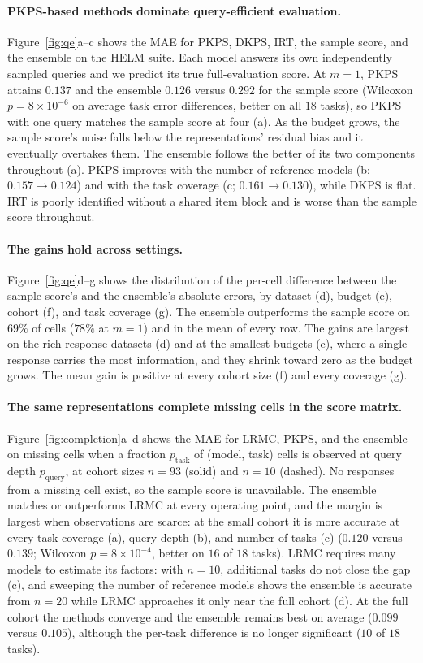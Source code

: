 \documentclass{article}
\theoremstyle{definition}
\theoremstyle{plain}
\newcommand{\PKPS}{PKPS\xspace}
\begin{document}
\paragraph{\PKPS-based methods dominate query-efficient evaluation.}
Figure~\ref{fig:qe}a--c shows the MAE for \PKPS, DKPS, IRT, the sample score, and
the ensemble on the HELM suite.
Each model answers its own independently sampled queries and we predict its true
full-evaluation score.
At $m{=}1$, \PKPS attains $0.137$ and the ensemble $0.126$ versus $0.292$ for the sample score (Wilcoxon $p{=}8\times10^{-6}$ on average task error differences, better on all $18$ tasks), so \PKPS with one query matches the sample score at four (a).
As the budget grows, the sample score's noise falls below the representations'
residual bias and it eventually overtakes them.
The ensemble follows the better of its two components
throughout (a).
\PKPS improves with the number of reference models
(b; $0.157\!\to\!0.124$) and with the task coverage (c; $0.161\!\to\!0.130$),
while DKPS is flat.
IRT is poorly identified without a shared item block and is worse than the sample
score throughout.

\paragraph{The gains hold across settings.}
Figure~\ref{fig:qe}d--g shows the distribution of the per-cell difference between
the sample score's and the ensemble's absolute errors, by dataset (d), budget (e),
cohort (f), and task coverage (g).
The ensemble outperforms the sample score on $69\%$ of cells ($78\%$ at $m{=}1$)
and in the mean of every row.
The gains are largest on the rich-response datasets (d) and at the smallest budgets
(e), where a single response carries the most information, and they shrink toward
zero as the budget grows.
The mean gain is positive at every cohort size (f) and every coverage (g).

\paragraph{The same representations complete missing cells in the score matrix.}
Figure~\ref{fig:completion}a--d shows the MAE for LRMC, \PKPS, and the ensemble on
missing cells when a fraction $p_{\mathrm{task}}$ of (model, task) cells is observed
at query depth $p_{\mathrm{query}}$, at cohort sizes $n{=}93$ (solid) and $n{=}10$
(dashed).
No responses from a missing cell exist, so the sample score is unavailable.
The ensemble matches or outperforms LRMC at every operating point, and the margin is
largest when observations are scarce: at the small cohort it is more accurate at
every task coverage (a), query depth (b), and number of tasks (c)
($0.120$ versus $0.139$; Wilcoxon
$p{=}8\times10^{-4}$, better on $16$ of $18$ tasks).
LRMC requires many models to estimate its factors: with $n{=}10$, additional tasks
do not close the gap (c), and sweeping the number of reference models shows the ensemble is accurate
from $n{=}20$ while LRMC approaches it only near the full cohort (d).
At the full cohort the methods converge and the ensemble remains best on average
($0.099$ versus $0.105$), although the per-task difference is no longer significant
($10$ of $18$ tasks).
\end{document}
